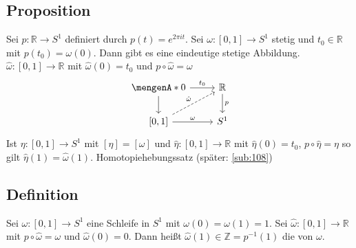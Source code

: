 \subsection[Proposition: Hebung eines Weges auf $S^1$ nach $\mathds{R}$]{Proposition} %
\label{sub:102}
Sei $p  : \mathds{R} \to S^1$ definiert durch $p(t) = e^{2 \pi i t}$. Sei $\omega : [0,1] \to S^1$ stetig und $t_0 \in \mathds{R}$ mit $p(t_0) = \omega(0)$.
Dann gibt es eine eindeutige stetige Abbildung. $\hat{\omega} : [0,1] \to \mathds{R}$ mit $\hat{\omega}(0) = t_0$ und $p  \circ  \hat{\omega} = \omega$
\[
	\begin{tikzcd}
		\set{0} \rar{t_0} \dar& \mathds{R} \dar{p} \\
		{[0,1]} \rar{\omega} \urar[dashed]{\hat{\omega}}& S^1 
	\end{tikzcd}
\]
Ist $\eta : [0,1] \to S^1$ mit $[\eta] = [\omega]$ und $\hat{\eta} : [0,1] \to \mathds{R}$ mit $\hat{\eta}(0)= t_0$, $p \circ \hat{\eta} = \eta$ so gilt 
$\hat{\eta}(1) = \hat{\omega}(1)$.
Homotopiehebungssatz (später: \ref{sub:108}) \bewende

\subsection[Definition: Windungszahl]{Definition} %
\label{sub:103}
Sei $\omega : [0,1] \to S^1$ eine Schleife in $S^1$ mit $\omega(0) = \omega(1) = 1$. Sei $\hat{\omega} : [0,1] \to \mathds{R}$ mit $p \circ  \hat{\omega} = \omega$ und
$\hat{\omega}(0)=0$. Dann heißt $\hat{\omega}(1) \in \mathds{Z} = p^{-1}(1)$ die  von $\omega$. 

